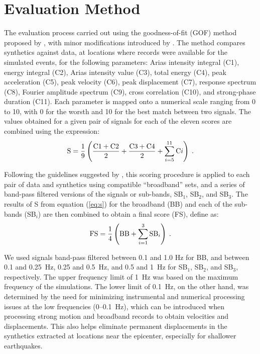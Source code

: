 
\section{Evaluation Method}

The evaluation process carried out using the goodness-of-fit (GOF) method proposed by \citet{Anderson_2004_Proc}, with minor modifications introduced by \citet{Taborda_2013_BSSA}. The method compares synthetics against data, at locations where records were available for the simulated events, for the following parameters: Arias intensity integral (C1), energy integral (C2), Arias intensity value (C3), total energy (C4), peak acceleration (C5), peak velocity (C6), peak displacement (C7), response spectrum (C8), Fourier amplitude spectrum (C9), cross correlation (C10), and strong-phase duration (C11). Each parameter is mapped onto a numerical scale ranging from 0 to 10, with 0 for the worsth and 10 for the best match between two signals. The values obtained for a given pair of signals for each of the eleven scores are combined using the expression: 
%
\begin{equation}
	\mathrm{S} = \frac{1}{9} \left( 
		\frac{\mathrm{C}1+\mathrm{C}2}{2} +
		\frac{\mathrm{C}3+\mathrm{C}4}{2} +
		\sum_{i=5}^{11} \mathrm{C}i
	\right)
	\hspace{0.25em}.
	\label{eq:s}
\end{equation}

Following the guidelines suggested by \citet{Anderson_2004_Proc}, this scoring procedure is applied to each pair of data and synthetics using compatible ``broadband'' sets, and a series of band-pass filtered versions of the signals or sub-bands, SB$_1$, SB$_2$, and SB$_3$. The results of S from equation (\ref{eq:s}) for the broadband (BB) and each of the sub-bands (SB$_i$) are then combined to obtain a final score (FS), define as:
%
\begin{equation}
	\mathrm{FS} = \frac{1}{4} \left( \mathrm{BB} + \sum^3_{i=1} \mathrm{SB}_i \right)
	\hspace{0.25em}.
	\label{eq:fs}
\end{equation}

We used signals band-pass filtered between 0.1 and 1.0 Hz for BB, and between 0.1 and 0.25~Hz, 0.25 and 0.5~Hz, and 0.5 and 1~Hz for SB$_1$, SB$_2$, and SB$_3$, respectively. The upper frequency limit of 1~Hz was based on the maximum frequency of the simulations. The lower limit of 0.1~Hz, on the other hand, was determined by the need for minimizing instrumental and numerical processing issues at the low frequencies (0--0.1~Hz), which can be introduced when processing strong motion and broadband records to obtain velocities and displacements. This also helps eliminate permanent displacements in the synthetics extracted at locations near the epicenter, especially for shallower earthquakes. 

